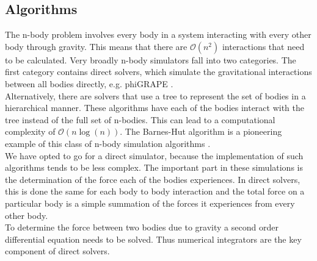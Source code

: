 \documentclass[11pt]{article} %
\begin{document}
\subsection{Algorithms}
The n-body problem involves every body in a system interacting with every other body through gravity. This means that there are $\mathcal{O}(n^2)$ interactions that need to be calculated. Very broadly n-body simulators fall into two categories. The first category contains direct solvers, which simulate the gravitational interactions between all bodies directly, e.g. phiGRAPE \cite{Harfst2007357}. \\
Alternatively, there are solvers that use a tree to represent the set of bodies in a hierarchical manner. These algorithms have each of the bodies interact with the tree instead of the full set of n-bodies. This can lead to a computational complexity of $\mathcal{O}(n \log(n))$. The Barnes-Hut algorithm is a pioneering example of this class of n-body simulation algorithms \cite{barnes1986hierarchical}.\\
We have opted to go for a direct simulator, because the implementation of such algorithms tends to be less complex. The important part in these simulations is the determination of the force each of the bodies experiences. In direct solvers, this is done the same for each body to body interaction and the total force on a particular body is a simple summation of the forces it experiences from every other body. \\
To determine the force between two bodies due to gravity a second order differential equation needs to be solved. Thus numerical integrators are the key component of direct solvers.
\end{document}
